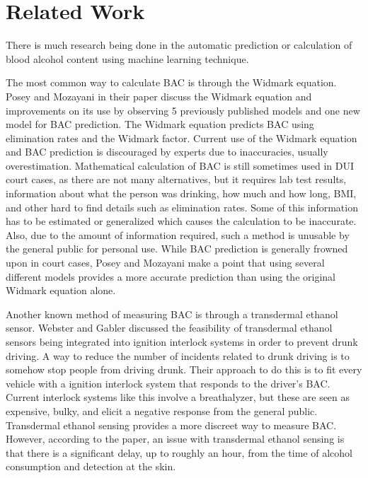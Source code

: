 \section{Related Work}
%
%

There is much research being done in the automatic prediction or calculation of blood alcohol content using machine learning technique.

The most common way to calculate BAC is through the Widmark equation. Posey and Mozayani in their paper \cite{Posey:2007} discuss the Widmark equation and improvements on its use by observing 5 previously published models and one new model for BAC prediction. The Widmark equation predicts BAC using elimination rates and the Widmark factor. Current use of the Widmark equation and BAC prediction is discouraged by experts due to inaccuracies, usually overestimation. Mathematical calculation of BAC is still sometimes used in DUI court cases, as there are not many alternatives, but it requires lab test results, information about what the person was drinking, how much and how long, BMI, and other hard to find details such as elimination rates. Some of this information has to be estimated or generalized which causes the calculation to be inaccurate. Also, due to the amount of information required, such a method is unusable by the general public for personal use. While BAC prediction is generally frowned upon in court cases, Posey and Mozayani make a point that using several different models provides a more accurate prediction than using the original Widmark equation alone.

Another known method of measuring BAC is through a transdermal ethanol sensor. Webster and Gabler \cite{Webster:2007} discussed the feasibility of transdermal ethanol sensors being integrated into ignition interlock systems in order to prevent drunk driving. A way to reduce the number of incidents related to drunk driving is to somehow stop people from driving drunk. Their approach to do this is to fit every vehicle with a ignition interlock system that responds to the driver's BAC. Current interlock systems like this involve a breathalyzer, but these are seen as expensive, bulky, and elicit a negative response from the general public. Transdermal ethanol sensing provides a more discreet way to measure BAC. However, according to the paper, an issue with transdermal ethanol sensing is that there is a significant delay, up to roughly an hour, from the time of alcohol consumption and detection at the skin. 

